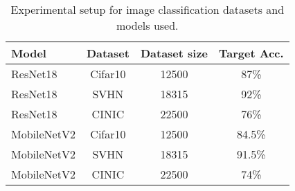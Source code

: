 \begin{table}[tb!]
  \caption{Experimental setup for image classification datasets and models used.}
  \label{table:experimet_setting}
  \centering
  \begin{tabular}{lccc}
    \toprule
    Model        & Dataset & Dataset size & Target Acc. \\
    \midrule
    ResNet18     & Cifar10 & 12500        &  87\% \\
    ResNet18     & SVHN    & 18315        &  92\% \\
    ResNet18     & CINIC   & 22500        &  76\% \\
    \midrule
    MobileNetV2  & Cifar10 & 12500        &  84.5\% \\
    MobileNetV2  & SVHN    & 18315        &  91.5\% \\
    MobileNetV2  & CINIC   & 22500        &  74\% \\
    \bottomrule
  \end{tabular}
\end{table}
